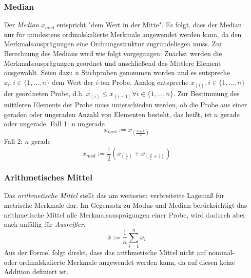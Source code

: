 \documentclass[fontsize=11pt]{scrartcl}
\begin{document}
                    \subsubsection{Median}
                        Der \emph{Median} $x_{med}$ entspricht "dem Wert in der Mitte". Es folgt, dass der Median nur für mindestens ordinalskalierte Merkmale angewendet werden kann, da den Merkmalsausprägungen eine Ordnungsstruktur zugrundeliegen muss. \cite{kohn2005}
                        \newline
                        Zur Berechnung des Medians wird wie folgt vorgegangen: Zuächst werden die Merkmalsausprägungen geordnet und anschließend das Mittlere Element ausgewählt. Seien dazu $n$ Stichproben genommen worden und es entspreche $x_i,i \in \{1,\dots,n\}$ dem Wert der $i$-ten Probe. Analog entspreche $x_{(i)}, i \in \{1,\dots,n\}$ der geordneten Probe, d.h. $x_{(i)} \leq x_{(i+1)} \forall i \in \{1,\dots,n\}$.
                        \newline
                        Zur Bestimmung des mittleren Elements der Probe muss unterschieden werden, ob die Probe aus einer geraden oder ungeraden Anzahl von Elementen besteht, das heißt, ist $n$ gerade oder ungerade.
                        \newline
                        Fall 1:
                        \newline
                        $n$ ungerade
                        $$ x_{med} := x_{(\frac{n+1}{2})} $$
                        Fall 2:
                        \newline
                        $n$ gerade
                        $$ x_{med} := \frac{1}{2}\left( x_{(\frac{n}{2})} + x_{(\frac{n}{2}+1)} \right) $$
                    \subsubsection{Arithmetisches Mittel}
                        Das \emph{arithmetische Mittel} stellt das am weitesten verbreitette Lagemaß für metrische Merkmale dar. Im Gegensatz zu Modus und Median berücksichtigt das arithmetische Mittel alle Merkmalsausprägungen einer Probe, wird dadurch aber auch anfällig für \emph{Ausreißer}.
                        $$ \bar{x} := \frac{1}{n}\sum_{i=1}^nx_i $$ 
                        Aus der Formel folgt direkt, dass das arithmetische Mittel nicht auf nominal- oder ordinalskalierte Merkmale angewendet werden kann, da auf diesen keine Addition definiert ist.
\end{document}
